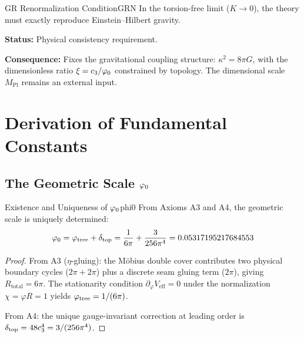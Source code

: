 \begin{axiom}{GR Renormalization Condition}{GRN}
In the torsion-free limit ($K \to 0$), the theory must exactly reproduce 
Einstein--Hilbert gravity.

\tcblower
\textbf{Status:} Physical consistency requirement.

\textbf{Consequence:} Fixes the gravitational coupling structure:
$\kappa^2 = 8\pi G$, with the dimensionless ratio $\xi = c_3/\varphi_0$ constrained by topology.
The dimensional scale $M_{\mathrm{Pl}}$ remains an external input.
\end{axiom}

\section{Derivation of Fundamental Constants}

\subsection{The Geometric Scale $\varphi_0$}

\begin{theorem}{Existence and Uniqueness of $\varphi_0$}{phi0}
From Axioms A3 and A4, the geometric scale is uniquely determined:
\begin{equation}
    \varphi_0 = \varphi_{\mathrm{tree}} + \delta_{\mathrm{top}} = \frac{1}{6\pi} + \frac{3}{256\pi^4} = 0.05317195217684553
\end{equation}
\end{theorem}

\begin{proof}
From A3 ($\eta$-gluing): the M\"obius double cover contributes two physical boundary
cycles ($2\pi+2\pi$) plus a discrete seam gluing term ($2\pi$), giving
$R_{\text{total}}=6\pi$. The stationarity condition $\partial_\varphi V_{\text{eff}} = 0$
under the normalization $\chi = \varphi R = 1$ yields $\varphi_{\mathrm{tree}} = 1/(6\pi)$.

From A4: the unique gauge-invariant correction at leading order is 
$\delta_{\mathrm{top}} = 48c_3^4 = 3/(256\pi^4)$.
\end{proof}

